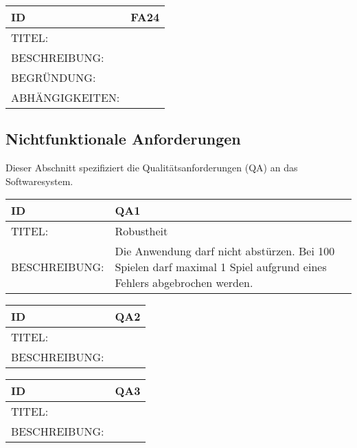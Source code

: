 \documentclass{uulm-assignment}
\begin{document}
\begin{tabularx}{16cm}{l|X}
\textbf{ID} & \textbf{FA24} \\
\hline
TITEL: & \\
\hline
BESCHREIBUNG: & 
\\
\hline
BEGRÜNDUNG: & \\
\hline
ABHÄNGIGKEITEN: & \\
\end{tabularx}

\subsection{Nichtfunktionale Anforderungen}

Dieser Abschnitt spezifiziert die Qualitätsanforderungen (QA) an das Softwaresystem.

\begin{tabularx}{16cm}{l|X}
\textbf{ID} & \textbf{QA1} \\
\hline
TITEL: & Robustheit \\
\hline
BESCHREIBUNG: & Die Anwendung darf nicht abstürzen. Bei 100 Spielen darf maximal 1 Spiel
aufgrund eines Fehlers abgebrochen werden. \\
\end{tabularx}

\begin{tabularx}{16cm}{l|X}
\textbf{ID} & \textbf{QA2} \\
\hline
TITEL: & \\
\hline
BESCHREIBUNG: & 
\\
\end{tabularx}

\begin{tabularx}{16cm}{l|X}
\textbf{ID} & \textbf{QA3} \\
\hline
TITEL: & \\
\hline
BESCHREIBUNG: & 
\\
\end{tabularx}
\end{document}
